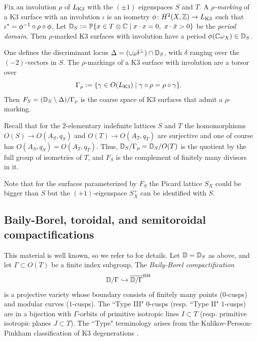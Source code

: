 \documentclass{amsart}
\begin{document}
Fix an involution $\rho$ of $L_{\rm K3}$ with the $(\pm 1)$ eigenspaces $S$ and
$T$. A {\it $\rho$-marking} of a K3 surface with an involution $\iota$ is an
isometry $\phi\colon H^2(X,{\mathbb Z})\to L_{\rm K3}$ such that $\iota^* = \phi^{-1}
\circ \rho \circ \phi$.  Let  ${\mathbb D}_S := {\mathbb P}\{x\in T\otimes{\mathbb C} \mid
 x\cdot x=0, \ x\cdot\bar x > 0 \}$ be the {\it period domain}.
 Then $\rho$-marked K3 surfaces with involution have a period
 $\phi({\mathbb C}\omega_X)\in {\mathbb D}_S$.

One defines the discriminant
locus $\Delta = (\cup_\delta \delta^\perp)\cap{\mathbb D}_S$, with $\delta$
ranging over the $(-2)$-vectors in $S$. The $\rho$-markings of
a K3 surface with involution are a torsor over
\begin{displaymath}
  \Gamma_\rho := \{ \gamma\in O(L_{\rm K3}) \mid \gamma\circ\rho = \rho\circ\gamma \}.
\end{displaymath}
Then $F_S=({\mathbb D}_S\setminus\Delta) / \Gamma_\rho$ is the coarse space
of K3 surfaces that admit a $\rho$-marking.

Recall that for the $2$-elementary indefinite lattices $S$ and $T$ the
homomorphisms $O(S)\to O(A_S,q_S)$ and $O(T)\to O(A_T,q_T)$ are
surjective and one of course has $O(A_S,q_S) = O(A_T,q_T)$. Thus,
${\mathbb D}_S/\Gamma_\rho={\mathbb D}_S/O(T)$ is the quotient
by the full group of isometries of $T$, and $F_S$ is the
complement of finitely many divisors in it.

Note that for the surfaces parameterized by $F_S$ the Picard
lattice $S_X$ could be bigger than $S$ but the $(+1)$-eigenspace
$S_X^+$ can be identified with $S$.

\subsection{Baily-Borel, toroidal, and semitoroidal compactifications}
\label{sec:bb-etc-compactifications}
This material is well known, so we refer to \cite{ash1975smooth-compactifications,
  looijenga2003compactifications-defined2} for details.
Let ${\mathbb D}={\mathbb D}_S$ as above, and let
$\Gamma\subset O(T)$ be a finite index subgroup.
The {\it Baily-Borel compactification}
$${\mathbb D}/\Gamma\hookrightarrow \overline{{\mathbb D}/\Gamma}^{\rm BB}$$
is a projective variety whose boundary
consists of finitely many points ($0$-cusps) and modular curves
($1$-cusps). The ``Type III" $0$-cusps (resp. ``Type II" $1$-cusps) are in a bijection with
$\Gamma$-orbits of primitive isotropic lines $I\subset T$ (resp. 
primitive isotropic planes $J\subset T$). The ``Type" terminology arises
from the Kulikov-Persson-Pinkham classification of K3 degenerations
\cite{kulikov1977degenerations-of-k3-surfaces,
  persson1981degeneration-of-surfaces}.
\end{document}
